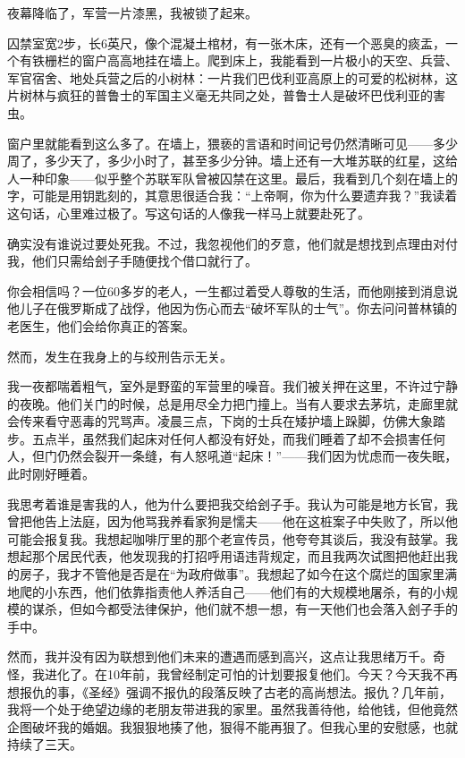 \documentclass[UTF8]{ctexart}
\begin{document}
夜幕降临了，军营一片漆黑，我被锁了起来。

囚禁室宽2步，长6英尺，像个混凝土棺材，有一张木床，还有一个恶臭的痰盂，一个有铁栅栏的窗户高高地挂在墙上。爬到床上，我能看到一片极小的天空、兵营、军官宿舍、地处兵营之后的小树林：一片我们巴伐利亚高原上的可爱的松树林，这片树林与疯狂的普鲁士的军国主义毫无共同之处，普鲁士人是破坏巴伐利亚的害虫。

窗户里就能看到这么多了。在墙上，猥亵的言语和时间记号仍然清晰可见——多少周了，多少天了，多少小时了，甚至多少分钟。墙上还有一大堆苏联的红星，这给人一种印象——似乎整个苏联军队曾被囚禁在这里。最后，我看到几个刻在墙上的字，可能是用钥匙刻的，其意思很适合我：“上帝啊，你为什么要遗弃我？”我读着这句话，心里难过极了。写这句话的人像我一样马上就要赴死了。

确实没有谁说过要处死我。不过，我忽视他们的歹意，他们就是想找到点理由对付我，他们只需给刽子手随便找个借口就行了。

你会相信吗？一位60多岁的老人，一生都过着受人尊敬的生活，而他刚接到消息说他儿子在俄罗斯成了战俘，他因为伤心而去“破坏军队的士气”。你去问问普林镇的老医生，他们会给你真正的答案。

然而，发生在我身上的与绞刑告示无关。

我一夜都喘着粗气，室外是野蛮的军营里的噪音。我们被关押在这里，不许过宁静的夜晚。他们关门的时候，总是用尽全力把门撞上。当有人要求去茅坑，走廊里就会传来看守恶毒的咒骂声。凌晨三点，下岗的士兵在矮护墙上跺脚，仿佛大象踏步。五点半，虽然我们起床对任何人都没有好处，而我们睡着了却不会损害任何人，但门仍然会裂开一条缝，有人怒吼道“起床！”——我们因为忧虑而一夜失眠，此时刚好睡着。

我思考着谁是害我的人，他为什么要把我交给刽子手。我认为可能是地方长官，我曾把他告上法庭，因为他骂我养看家狗是懦夫——他在这桩案子中失败了，所以他可能会报复我。我想起咖啡厅里的那个老宣传员，他夸夸其谈后，我没有鼓掌。我想起那个居民代表，他发现我的打招呼用语违背规定，而且我两次试图把他赶出我的房子，我才不管他是否是在“为政府做事”。我想起了如今在这个腐烂的国家里满地爬的小东西，他们依靠指责他人养活自己——他们有的大规模地屠杀，有的小规模的谋杀，但如今都受法律保护，他们就不想一想，有一天他们也会落入刽子手的手中。

然而，我并没有因为联想到他们未来的遭遇而感到高兴，这点让我思绪万千。奇怪，我进化了。在10年前，我曾经制定可怕的计划要报复他们。今天？今天我不再想报仇的事，《圣经》强调不报仇的段落反映了古老的高尚想法。报仇？几年前，我将一个处于绝望边缘的老朋友带进我的家里。虽然我善待他，给他钱，但他竟然企图破坏我的婚姻。我狠狠地揍了他，狠得不能再狠了。但我心里的安慰感，也就持续了三天。
\end{document}
